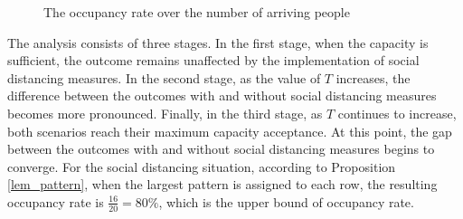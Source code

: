 
\begin{figure}[h]
  \centering
  \caption{The occupancy rate over the number of arriving people}
  \label{Fig.lable}
\end{figure}

The analysis consists of three stages. 
In the first stage, when the capacity is sufficient, the outcome remains unaffected by the implementation of social distancing measures. In the second stage, as the value of $T$ increases, the difference between the outcomes with and without social distancing measures becomes more pronounced. Finally, in the third stage, as $T$ continues to increase, both scenarios reach their maximum capacity acceptance. At this point, the gap between the outcomes with and without social distancing measures begins to converge. For the social distancing situation, according to Proposition \ref{lem_pattern}, when the largest pattern is assigned to each row, the resulting occupancy rate is $\frac{16}{20} = 80\%$, which is the upper bound of occupancy rate.


